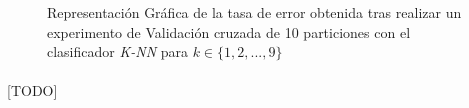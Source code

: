 \documentclass{article}
\begin{document}
		\begin{figure}
			\begin{center}
			\end{center}
			\caption{Representación Gráfica de la tasa de error obtenida tras realizar un experimento de Validación cruzada de 10 particiones con el clasificador \emph{K-NN} para $k \in \{1,2,...,9\}$}
			\label{plot:e2}
		\end{figure}

		\paragraph{}
		[TODO]


	\nocite{garciparedes:machine-learning-instance-based}
	\nocite{subject:taa}
	\nocite{tool:weka}
  
  
\end{document}
